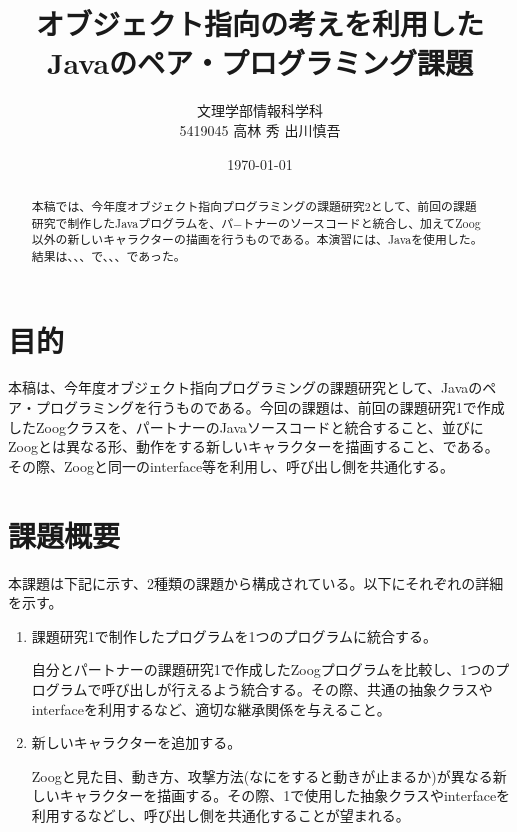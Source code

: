 \documentclass[dvipdfmx]{jsarticle}
\title{オブジェクト指向の考えを利用したJavaのペア・プログラミング課題}
\author{文理学部情報科学科\\5419045 高林 秀 出川慎吾}
\date{\today}
\begin{document}
\maketitle

\begin{abstract}
  本稿では、今年度オブジェクト指向プログラミングの課題研究2として、前回の課題研究で制作したJavaプログラムを、パ−トナーのソースコードと統合し、加えてZoog以外の新しいキャラクターの描画を行うものである。本演習には、Javaを使用した。
  結果は、、、で、、、であった。
\end{abstract}

\section{目的}
本稿は、今年度オブジェクト指向プログラミングの課題研究として、Javaのペア・プログラミングを行うものである。今回の課題は、前回の課題研究1で作成したZoogクラスを、パートナーのJavaソースコードと統合すること、並びにZoogとは異なる形、動作をする新しいキャラクターを描画すること、である。その際、Zoogと同一のinterface等を利用し、呼び出し側を共通化する。

\section{課題概要}
本課題は下記に示す、2種類の課題から構成されている。以下にそれぞれの詳細を示す。
\begin{enumerate}
  \item 課題研究1で制作したプログラムを1つのプログラムに統合する。\par
  自分とパートナーの課題研究1で作成したZoogプログラムを比較し、1つのプログラムで呼び出しが行えるよう統合する。その際、共通の抽象クラスやinterfaceを利用するなど、適切な継承関係を与えること。
  \item 新しいキャラクターを追加する。\par
  Zoogと見た目、動き方、攻撃方法(なにをすると動きが止まるか)が異なる新しいキャラクターを描画する。その際、1で使用した抽象クラスやinterfaceを利用するなどし、呼び出し側を共通化することが望まれる。
\end{enumerate}
\end{document}
